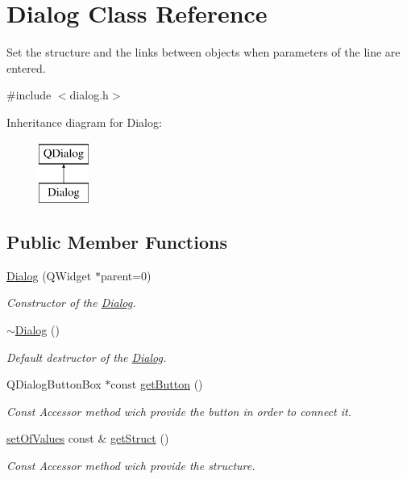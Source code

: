 \hypertarget{class_dialog}{}\section{Dialog Class Reference}
\label{class_dialog}


Set the structure and the links between objects when parameters of the line are entered.  




{\ttfamily \#include $<$dialog.\+h$>$}

Inheritance diagram for Dialog\+:\begin{figure}[H]
\begin{center}
\leavevmode
\includegraphics[height=2.000000cm]{class_dialog}
\end{center}
\end{figure}
\subsection*{Public Member Functions}
\begin{DoxyCompactItemize}
\item 
\hyperlink{class_dialog_acfa2063f9f962d394c6a645b6e7e08d8}{Dialog} (Q\+Widget $\ast$parent=0)
\begin{DoxyCompactList}\small\item\em Constructor of the \hyperlink{class_dialog}{Dialog}. \end{DoxyCompactList}\item 
\hyperlink{class_dialog_a2a1fe6ef28513eed13bfcd3a4da83ccb}{$\sim$\+Dialog} ()
\begin{DoxyCompactList}\small\item\em Default destructor of the \hyperlink{class_dialog}{Dialog}. \end{DoxyCompactList}\item 
Q\+Dialog\+Button\+Box $\ast$const \hyperlink{class_dialog_a378ce1b268dfbb518ea04bb5a7032a4e}{get\+Button} ()
\begin{DoxyCompactList}\small\item\em Const Accessor method wich provide the button in order to connect it. \end{DoxyCompactList}\item 
\hyperlink{structset_of_values}{set\+Of\+Values} const  \& \hyperlink{class_dialog_a530b0b5779a9bfd94e47c271baa1af62}{get\+Struct} ()
\begin{DoxyCompactList}\small\item\em Const Accessor method wich provide the structure. \end{DoxyCompactList}\end{DoxyCompactItemize}


